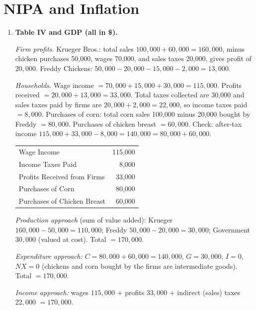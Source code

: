 \documentclass[11pt]{article}
\begin{document}
\section{NIPA and Inflation}

\begin{enumerate}[label=\textbf{\arabic*.}, leftmargin=*]

\item \textbf{Table IV and GDP (all in \$).}

\emph{Firm profits.} Krueger Bros.: total sales $100{,}000+60{,}000=160{,}000$, minus chicken purchases 50,000, wages 70,000, and sales taxes 20,000, gives profit of $20{,}000$. Freddy Chickens: $50{,}000-20{,}000-15{,}000-2{,}000 = 13{,}000$.

\emph{Households.} Wage income $=70{,}000+15{,}000+30{,}000 = 115{,}000$. Profits received $=20{,}000+13{,}000 = 33{,}000$. Total taxes collected are 30,000 and sales taxes paid by firms are $20{,}000+2{,}000=22{,}000$, so income taxes paid $=8{,}000$. Purchases of corn: total corn sales 100,000 minus 20,000 bought by Freddy $=80{,}000$. Purchases of chicken breast $=60{,}000$. Check: after-tax income $115{,}000+33{,}000-8{,}000 = 140{,}000 = 80{,}000 + 60{,}000$. \checkmark

\begin{table}[H]\centering
\begin{tabular}{lr}
\toprule
Wage Income & 115,000 \\
Income Taxes Paid & 8,000 \\
Profits Received from Firms & 33,000 \\
Purchases of Corn & 80,000 \\
Purchases of Chicken Breast & 60,000 \\
\bottomrule
\end{tabular}
\end{table}

\emph{Production approach} (sum of value added): Krueger $160{,}000-50{,}000 = 110{,}000$; Freddy $50{,}000-20{,}000 = 30{,}000$; Government $30{,}000$ (valued at cost). Total $=170{,}000$.

\emph{Expenditure approach:} $C = 80{,}000+60{,}000=140{,}000$, $G=30{,}000$, $I=0$, $NX=0$ (chickens and corn bought by the firms are intermediate goods). Total $=170{,}000$.

\emph{Income approach:} wages $115{,}000$ + profits $33{,}000$ + indirect (sales) taxes $22{,}000$ $=170{,}000$.


\end{enumerate}
\end{document}
